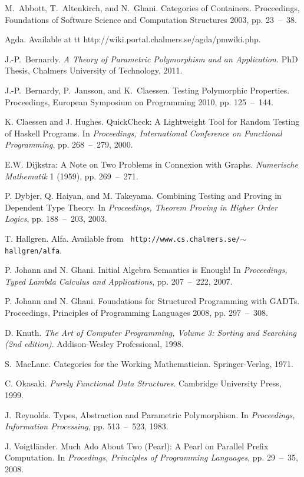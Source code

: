 \documentclass{article}[12 pt]
\theoremstyle{problemstyle}
\begin{document}
\begin{thebibliography}{12345}

 M.\ Abbott, T.\ Altenkirch, and
  N.\ Ghani. Categories of Containers. Proceedings, Foundations of
  Software Science and Computation Structures 2003, pp. 23~--~38.

 Agda. Available at {tt
  http://wiki.portal.chalmers.se/agda/pmwiki.php}. 

 J.-P.\ Bernardy. {\em A Theory of Parametric
  Polymorphism and an Application.} PhD Thesis, Chalmers University of
  Technology, 2011. 

 J.-P.\ Bernardy, P.\ Jansson, and
  K.\ Claessen. Testing Polymorphic Properties. Proceedings, European
  Symposium on Programming 2010, pp. 125~--~144.

 K. Claessen and J. Hughes. QuickCheck: A Lightweight
  Tool for Random Testing of Haskell Programs. In {\em Proceedings,
    International Conference on Functional Programming},
  pp. 268~--~279, 2000.

 E.W. Dijkstra: A Note on Two Problems in Connexion
  with Graphs. {\em Numerische Mathematik} 1 (1959), pp. 269~--~271. 

 P. Dybjer, Q. Haiyan, and M. Takeyama. Combining
  Testing and Proving in Dependent Type Theory. In {\em Proceedings,
    Theorem Proving in Higher Order Logics}, pp. 188~--~203, 2003.

 T. Hallgren. Alfa. Available from {\tt
  http://www.cs.chalmers.se/$\sim$hallgren/alfa}. 

 P. Johann and N. Ghani. Initial Algebra Semantics is
  Enough! In {\em Proceedings, Typed Lambda
  Calculus and Applications}, pp. 207~--~222, 2007.

 P. Johann and N. Ghani. Foundations for Structured
  Programming with GADTs. Proceedings, Principles of Programming
  Languages 2008, pp. 297~--~308.

 D. Knuth. {\em The Art of Computer Programming, Volume 3:
  Sorting and Searching (2nd edition)}. Addison-Wesley Professional,
  1998. 

S.\ {MacLane}. {C}ategories for the {W}orking {M}athematician.
Springer-Verlag, 1971.

C. Okasaki. {\em Purely Functional Data Structures}. Cambridge
University Press, 1999.

 J.~Reynolds. Types, Abstraction and Parametric
  Polymorphism.  In {\em Proceedings, Information Processing},
  pp. 513~--~523, 1983.

 J. Voigtl\"ander. Much Ado About Two (Pearl): A Pearl
  on Parallel Prefix Computation. In {\em Procedings, Principles of
    Programming Languages}, pp. 29~--~35, 2008.

\end{thebibliography}
\end{document}
